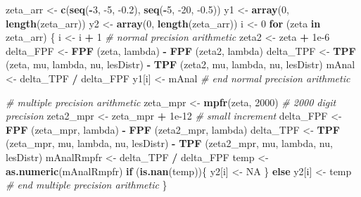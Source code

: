 \documentclass[
]{book}
\newenvironment{Shaded}{\begin{snugshade}}{\end{snugshade}}
\newcommand{\CommentTok}[1]{\textcolor[rgb]{0.56,0.35,0.01}{\textit{#1}}}
\newcommand{\ControlFlowTok}[1]{\textcolor[rgb]{0.13,0.29,0.53}{\textbf{#1}}}
\newcommand{\DecValTok}[1]{\textcolor[rgb]{0.00,0.00,0.81}{#1}}
\newcommand{\FloatTok}[1]{\textcolor[rgb]{0.00,0.00,0.81}{#1}}
\newcommand{\KeywordTok}[1]{\textcolor[rgb]{0.13,0.29,0.53}{\textbf{#1}}}
\newcommand{\NormalTok}[1]{#1}
\newcommand{\OperatorTok}[1]{\textcolor[rgb]{0.81,0.36,0.00}{\textbf{#1}}}
\newcommand{\OtherTok}[1]{\textcolor[rgb]{0.56,0.35,0.01}{#1}}
\newcommand{\StringTok}[1]{\textcolor[rgb]{0.31,0.60,0.02}{#1}}
\begin{document}
\begin{Shaded}
\begin{Highlighting}[]
\NormalTok{zeta_arr <-}\StringTok{ }\KeywordTok{c}\NormalTok{(}\KeywordTok{seq}\NormalTok{(}\OperatorTok{-}\DecValTok{3}\NormalTok{, }\DecValTok{-5}\NormalTok{, }\FloatTok{-0.2}\NormalTok{), }\KeywordTok{seq}\NormalTok{(}\OperatorTok{-}\DecValTok{5}\NormalTok{, }\DecValTok{-20}\NormalTok{, }\FloatTok{-0.5}\NormalTok{))}
\NormalTok{y1 <-}\StringTok{ }\KeywordTok{array}\NormalTok{(}\DecValTok{0}\NormalTok{, }\KeywordTok{length}\NormalTok{(zeta_arr))}
\NormalTok{y2 <-}\StringTok{ }\KeywordTok{array}\NormalTok{(}\DecValTok{0}\NormalTok{, }\KeywordTok{length}\NormalTok{(zeta_arr))}
\NormalTok{i <-}\StringTok{ }\DecValTok{0}
\ControlFlowTok{for}\NormalTok{ (zeta }\ControlFlowTok{in}\NormalTok{ zeta_arr) \{}
\NormalTok{  i <-}\StringTok{ }\NormalTok{i }\OperatorTok{+}\StringTok{ }\DecValTok{1}
  \CommentTok{# normal precision arithmetic}
\NormalTok{  zeta2 <-}\StringTok{ }\NormalTok{zeta }\OperatorTok{+}\StringTok{ }\FloatTok{1e-6}
\NormalTok{  delta_FPF <-}\StringTok{ }\KeywordTok{FPF}\NormalTok{ (zeta, lambda) }\OperatorTok{-}\StringTok{ }\KeywordTok{FPF}\NormalTok{ (zeta2, lambda)}
\NormalTok{  delta_TPF <-}\StringTok{ }\KeywordTok{TPF}\NormalTok{ (zeta, mu, lambda, nu, lesDistr) }\OperatorTok{-}\StringTok{ }
\StringTok{    }\KeywordTok{TPF}\NormalTok{ (zeta2, mu, lambda, nu, lesDistr)}
\NormalTok{  mAnal <-}\StringTok{ }\NormalTok{delta_TPF }\OperatorTok{/}\StringTok{ }\NormalTok{delta_FPF}
\NormalTok{  y1[i] <-}\StringTok{ }\NormalTok{mAnal}
  \CommentTok{# end normal precision arithmetic}
  
  \CommentTok{# multiple precision arithmetic}
\NormalTok{  zeta_mpr <-}\StringTok{ }\KeywordTok{mpfr}\NormalTok{(zeta, }\DecValTok{2000}\NormalTok{) }\CommentTok{# 2000 digit precision}
\NormalTok{  zeta2_mpr <-}\StringTok{ }\NormalTok{zeta_mpr }\OperatorTok{+}\StringTok{ }\FloatTok{1e-12} \CommentTok{# small increment}
\NormalTok{  delta_FPF <-}\StringTok{ }\KeywordTok{FPF}\NormalTok{ (zeta_mpr, lambda) }\OperatorTok{-}\StringTok{ }\KeywordTok{FPF}\NormalTok{ (zeta2_mpr, lambda)}
\NormalTok{  delta_TPF <-}\StringTok{ }\KeywordTok{TPF}\NormalTok{ (zeta_mpr, mu, lambda, nu, lesDistr) }\OperatorTok{-}\StringTok{ }
\StringTok{    }\KeywordTok{TPF}\NormalTok{ (zeta2_mpr, mu, lambda, nu, lesDistr)}
\NormalTok{  mAnalRmpfr <-}\StringTok{ }\NormalTok{delta_TPF }\OperatorTok{/}\StringTok{ }\NormalTok{delta_FPF}
\NormalTok{  temp <-}\StringTok{ }\KeywordTok{as.numeric}\NormalTok{(mAnalRmpfr)}
  \ControlFlowTok{if}\NormalTok{ (}\KeywordTok{is.nan}\NormalTok{(temp))\{}
\NormalTok{    y2[i] <-}\StringTok{ }\OtherTok{NA}
\NormalTok{  \} }\ControlFlowTok{else}\NormalTok{ y2[i] <-}\StringTok{ }\NormalTok{temp }
  \CommentTok{# end multiple precision arithmetic}
\NormalTok{\}}
\end{Highlighting}
\end{Shaded}
\end{document}
